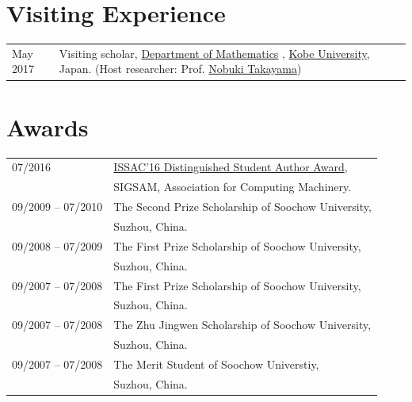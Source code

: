 \documentclass[a4paper,12pt]{article}
\begin{document}
\section*{\Large{Visiting Experience}}
\begin{tabular}{@{}p{0.8in}p{4.5in}}
May 2017               & Visiting scholar, 
                        \href{http://www.math.kobe-u.ac.jp/}{Department of Mathematics} ,
                        \href{http://www.kobe-u.ac.jp/en/}{Kobe University}, Japan. 
                        (Host researcher: Prof. \href{http://www.math.kobe-u.ac.jp/home-j/takayama-e.html}{Nobuki Takayama})\\
\end{tabular}

\section*{\Large{Awards}}
\begin{tabular}{@{}p{1.4in}p{4in}}
07/2016               & \href{https://www.sigsam.org/Awards/ISSACAwards.html}{ISSAC'16 Distinguished Student Author Award}, \\
                      & SIGSAM, Association for Computing Machinery. \\
09/2009 -- 07/2010    & The Second Prize Scholarship of Soochow University, \\ 
                      & Suzhou, China.\\
09/2008 -- 07/2009    & The First Prize Scholarship of Soochow University, \\ 
                      & Suzhou, China.\\
09/2007 -- 07/2008    & The First Prize Scholarship of Soochow University, \\ 
                      & Suzhou, China.\\
09/2007 -- 07/2008    & The Zhu Jingwen Scholarship of Soochow University, \\ 
                      & Suzhou, China.\\
09/2007 -- 07/2008    & The Merit Student of Soochow Universtiy, \\ 
                      & Suzhou, China.\\
\end{tabular}

\end{document}

